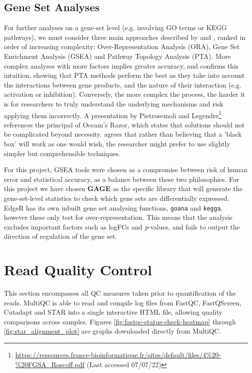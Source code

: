 \subsection{Gene Set Analyses}

For further analyses on a gene-set level (e.g. involving \ac{GO} terms or \ac{KEGG} pathways), we must consider three main approaches described by \cite{khatri2012ten} and \cite{alhamdoosh2017combining}, ranked in order of increasing complexity: Over-Representation Analysis (\ac{ORA}), Gene Set Enrichment Analysis (\ac{GSEA}) and Pathway Topology Analysis (\ac{PTA}). More complex analyses with more factors implies greater accuracy, and \cite{nguyen2019identifying} confirms this intuition, showing that \ac{PTA} methods perform the best as they take into account the interactions between gene products, and the nature of their interaction (e.g. activation or inhibition). Conversely, the more complex the process, the harder it is for researchers to truly understand the underlying mechanisms and risk applying them incorrectly. A presentation by Pietrosemoli and Legendre\footnote{\url{https://ressources.france-bioinformatique.fr/sites/default/files/4\%20-\%20FGSA_Roscoff.pdf} (Last accessed 07/07/22)} references the principal of Occam’s Razor, which states that solutions should not be complicated beyond necessity. \cite{albert2020biostar} agrees that rather than believing that a 'black box' will work as one would wish, the researcher might prefer to use slightly simpler but comprehensible techniques.

For this project, \ac{GSEA} tools were chosen as a compromise between risk of human error and statistical accuracy, as a balance between these two philosophies. For this project we have chosen \textbf{GAGE} as the specific library that will generate the gene-set-level statistics to check which gene sets are differentially expressed. EdgeR has its own inbuilt gene set analysing functions, \texttt{goana} and \texttt{kegga}, however these only test for over-representation. This means that the analysis excludes important factors such as \ac{logFC}s and \textit{p}-values, and fails to output the direction of regulation of the gene set.

\section{Read Quality Control}

This section encompasses all QC measures taken prior to quantification of the reads. MultiQC is able to read and compile log files from FastQC, FastQScreen, Cutadapt and STAR into a single interactive HTML file, allowing quality comparisons across samples. Figures \ref{fig:fastqc-status-check-heatmap} through \ref{fig:star_alignment_plot} are graphs downloaded directly from MultiQC.


